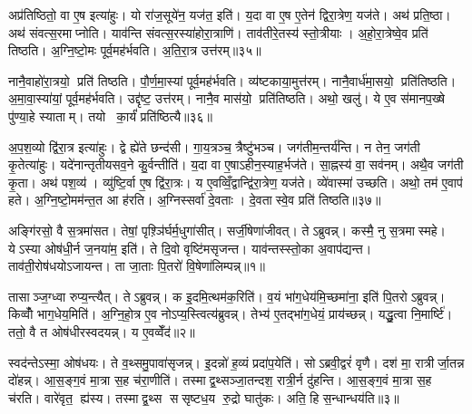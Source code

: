 अप्र॑तिष्ठितो॒ वा ए॒ष इत्या॑हुः। यो रा॑ज॒सूये॑न॒ यज॑त॒ इति॑। य॒दा वा ए॒ष ए॒तेन॑ द्विरा॒त्रेण॒ यज॑ते। अथ॑ प्रति॒ष्ठा। अथ॑ संवत्स॒रमाप्नोति। याव॑न्ति संवत्स॒रस्या॑होरा॒त्राणि॑। ताव॑तीरे॒तस्य॑ स्तो॒त्रीयाः। अ॒हो॒रा॒त्रेष्वे॒व प्रति॑ तिष्ठति। अ॒ग्नि॒ष्टो॒मः पूर्व॒मह॑र्भवति। अ॒ति॒रा॒त्र उत्त॑रम्॥३५॥

नानै॒वाहो॑रा॒त्रयो॒ प्रति॑ तिष्ठति। पौ॒र्ण॒मा॒स्यां पूर्व॒मह॑र्भवति। व्य॑ष्टकाया॒मुत्त॑रम्। नानै॒वार्ध॑मा॒सयो॒ प्रति॑तिष्ठति। अ॒मा॒वा॒स्या॑यां॒ पूर्व॒मह॑र्भवति। उद्दृ॑ष्ट॒ उत्त॑रम्। नानै॒व मास॑यो॒ प्रति॑तिष्ठति। अथो॒ खलु॑। ये ए॒व स॑मानप॒ख्षे पु॑ण्या॒हे स्याताम्। तयो का॒र्यं॑ प्रति॑ष्ठित्यै॥३६॥

अ॒प॒श॒व्यो द्वि॑रा॒त्र इत्या॑हुः। द्वे ह्ये॑ते छन्द॑सी। गा॒य॒त्रञ्च॒ त्रैष्टु॑भञ्च। जग॑तीम॒न्तर्य॑न्ति। न तेन॒ जग॑ती कृ॒तेत्या॑हुः। यदे॑नान्तृतीयसव॒ने कु॒र्वन्तीति॑। य॒दा वा ए॒षाऽहीन॒स्याह॒र्भज॑ते। सा॒ह्नस्य॑ वा॒ सव॑नम्। अथै॒व जग॑ती कृ॒ता। अथ॑ पश॒व्य॑। व्यु॑ष्टि॒र्वा ए॒ष द्वि॑रा॒त्रः। य ए॒वव्विँ॒द्वान्द्वि॑रा॒त्रेण॒ यज॑ते। व्ये॑वास्मा॑ उच्छति। अथो॒ तम॑ ए॒वाप॑ हते। अ॒ग्नि॒ष्टो॒मम॑न्त॒त आ ह॑रति। अ॒ग्निस्सर्वा॑ दे॒वताः। दे॒वतास्वे॒व प्रति॑ तिष्ठति॥३७॥

\clearpage
{}



\setcounter{anuvakam}{0}
अङ्गि॑रसो॒ वै स॒त्रमा॑सत। तेषां॒ पृश़्ञि॑र्घर्म॒धुगा॑सीत्। सर्जी॒षेणा॑जीवत्। तेऽब्रुवन्न्। कस्मै॒ नु स॒त्रमास्महे। येऽस्या ओष॑धी॒र्न ज॒नया॑म॒ इति॑। ते दि॒वो वृष्टि॑मसृजन्त। याव॑न्तस्स्तो॒का अ॒वाप॑द्यन्त। ताव॑ती॒रोष॑धयोऽजायन्त। ता जा॒ताः पि॒तरो॑ वि॒षेणा॑लिम्पन्न्॥१॥

तासाञ्ज॒ग्ध्वा रुप्य॒न्त्यैत्। तेऽब्रुवन्न्। क इ॒दमि॒त्थम॑क॒रिति॑। व॒यं भा॑ग॒धेय॑मि॒च्छमा॑ना॒ इति॑ पि॒तरोऽब्रुवन्न्। किव्वोँ॑ भाग॒धेय॒मिति॑। अ॒ग्नि॒हो॒त्र ए॒व नोऽप्य॒स्त्वित्य॑ब्रुवन्न्। तेभ्य॑ ए॒तद्भा॑ग॒धेयं॒ प्राय॑च्छन्न्। यद्धु॒त्वा नि॒मार्ष्टि॑। ततो॒ वै त ओष॑धीरस्वदयन्न्। य ए॒वव्वेँद॑॥२॥

स्वद॑न्तेऽस्मा॒ ओष॑धयः। ते व॒थ्समु॒पावा॑सृजन्न्। इ॒दन्नो॑ ह॒व्यं प्रदा॑प॒येति॑। सोऽब्रवी॒द्वरं॑ वृणै। दश॑ मा॒ रात्रीर्जा॒तन्न दो॑हन्न्। आ॒स॒ङ्ग॒वं मा॒त्रा स॒ह च॑रा॒णीति॑। तस्माद्व॒थ्सञ्जा॒तन्दश॒ रात्री॒र्न दु॑हन्ति। आ॒स॒ङ्ग॒वं मा॒त्रा स॒ह च॑रति। वारे॑वृत॒ ह्य॑स्य। तस्माद्व॒थ्स ससृष्टध॒य रु॒द्रो घातु॑कः। अति॒ हि स॒न्धान्धय॑ति॥३॥\anuvakamend[अ॒लि॒म्प॒न्वेद॒ घातु॑क॒ एक॑ञ्च]

